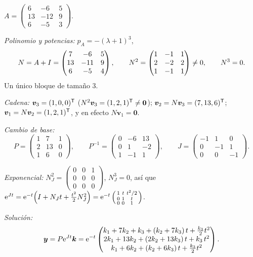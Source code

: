 \documentclass[11pt,twoside]{article}
\newcommand\vy{\bm{y}}
\newcommand\vv{\bm{v}}
\newcommand\vk{\bm{k}}
\newcommand\mat[1]{\begin{pmatrix}#1\end{pmatrix}}
\newcommand\smat[1]{\left(\begin{smallmatrix}#1\end{smallmatrix}\right)}
\begin{document}
\begin{ejemplo}[raíz triple con $g=1$]\label{ej:4-3}
$A=\smat{6&-6&5\\13&-12&9\\6&-5&3}$.
\begin{pasos}
\item \emph{Polinomio y potencias:} $p_A=-(\lambda+1)^3$,
\begin{equation*}
N=A+\Id=\mat{7&-6&5\\13&-11&9\\6&-5&4},\qquad N^2=\mat{1&-1&1\\2&-2&2\\1&-1&1}\neq0,\qquad N^3=0 .
\end{equation*}
Un único bloque de tamaño 3.
\item \emph{Cadena:} $\vv_3=(1,0,0)\T$ ($N^2\vv_3=(1,2,1)\T\neq\bm0$); $\vv_2=N\vv_3=(7,13,6)\T$;
$\vv_1=N\vv_2=(1,2,1)\T$, y en efecto $N\vv_1=\bm0$.
\item \emph{Cambio de base:}
\begin{equation*}
P=\mat{1&7&1\\2&13&0\\1&6&0},\qquad P^{-1}=\mat{0&-6&13\\0&1&-2\\1&-1&1},\qquad
J=\mat{-1&1&0\\0&-1&1\\0&0&-1}.
\end{equation*}
\item \emph{Exponencial:} $N_J^2=\smat{0&0&1\\0&0&0\\0&0&0}$, $N_J^3=0$, así que
$\e^{Jt}=\e^{-t}\Big(\Id+N_Jt+\tfrac{t^2}{2}N_J^2\Big)=\e^{-t}\smat{1&t&t^2/2\\0&1&t\\0&0&1}$.
\item \emph{Solución:}
\begin{equation*}
\vy=P\e^{Jt}\vk=\e^{-t}\mat{k_1+7k_2+k_3+(k_2+7k_3)\,t+\tfrac{k_3}{2}t^2\\
2k_1+13k_2+(2k_2+13k_3)\,t+k_3\,t^2\\ k_1+6k_2+(k_2+6k_3)\,t+\tfrac{k_3}{2}t^2}.
\end{equation*}
\end{pasos}
\end{ejemplo}
\end{document}
